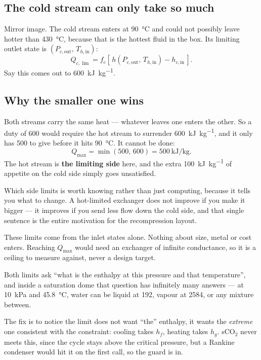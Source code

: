 \documentclass[11pt,a4paper]{report}
\begin{document}
\subsection{The cold stream can only take so much}

Mirror image. The cold stream enters at \SI{90}{\celsius} and could not
possibly leave hotter than \SI{430}{\celsius}, because that is the hottest
fluid in the box. Its limiting outlet state is
$(P_{c,\mathrm{out}},\, T_{h,\mathrm{in}})$:
\[
  Q_{c,\lim} = f_c \left[\, h(P_{c,\mathrm{out}},\, T_{h,\mathrm{in}})
  - h_{c,\mathrm{in}} \,\right].
\]
Say this comes out to \SI{600}{\kilo\joule\per\kilogram}.

\subsection{Why the smaller one wins}

Both streams carry the same heat --- whatever leaves one enters the other.
So a duty of \SI{600}{} would require the hot stream to surrender
\SI{600}{\kilo\joule\per\kilogram}, and it only has \SI{500}{} to give
before it hits \SI{90}{\celsius}. It cannot be done:
\[
  Q_{\max} = \min(500,\, 600) = \SI{500}{\kilo\joule\per\kilogram}.
\]
The hot stream is \textbf{the limiting side} here, and the extra
\SI{100}{\kilo\joule\per\kilogram} of appetite on the cold side simply goes
unsatisfied.

Which side limits is worth knowing rather than just computing, because it
tells you what to change. A hot-limited exchanger does not improve if you
make it bigger --- it improves if you send less flow down the cold side, and
that single sentence is the entire motivation for the recompression layout.

\begin{caveat}[title={Caveat: $Q_{\max}$ needs infinite hardware}]
These limits come from the inlet states alone. Nothing about size, metal or
cost enters. Reaching $Q_{\max}$ would need an exchanger of infinite
conductance, so it is a ceiling to measure against, never a design target.
\end{caveat}

\begin{caveat}[title={Caveat: the lookup $h(P,T)$ is ambiguous in a two-phase region}]
Both limits ask ``what is the enthalpy at this pressure and that
temperature'', and inside a saturation dome that question has infinitely
many answers --- at \SI{10}{\kilo\pascal} and \SI{45.8}{\celsius}, water can
be liquid at \SI{192}{}, vapour at \SI{2584}{}, or any mixture between.

The fix is to notice the limit does not want ``the'' enthalpy, it wants the
\emph{extreme} one consistent with the constraint: cooling takes $h_f$,
heating takes $h_g$. sCO$_2$ never meets this, since the cycle stays above
the critical pressure, but a Rankine condenser would hit it on the first
call, so the guard is in.
\end{caveat}
\end{document}
